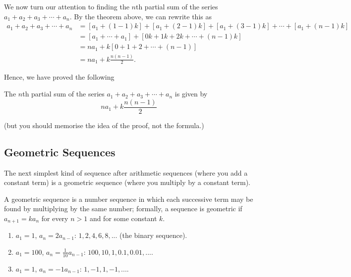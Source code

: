 We now turn our attention to finding the $ n$th partial sum of the series $ a_1 + a_2 + a_3 + \cdots + a_n $. By the
theorem above, we can rewrite this as
\begin{align*}
  a_1 + a_2 + a_3 + \cdots + a_n &= [a_1 + (1 - 1)k] + [a_1 + (2 - 1)k] + [a_1 + (3 - 1)k] + \cdots + [a_1 + (n - 1)k]\\
                                 &= [a_1 + \cdots + a_1] + [0k + 1k + 2k + \cdots + (n-1)k]\\
                                 &= na_1 + k[0 + 1 + 2 + \cdots + (n - 1)]\\
                                 &= na_1 + k \frac{n(n - 1)}{2}.
\end{align*}

Hence, we have proved the following
\begin{thm}
  The $ n$th partial sum of the series $ a_1 + a_2 + a_3 + \cdots + a_n $ is given by
  \begin{displaymath}
    na_1 + k \frac{n(n - 1)}{2}
  \end{displaymath}
\end{thm}
(but you should memorise the idea of the proof, not the formula.)

\subsection*{Geometric Sequences}
The next simplest kind of sequence after arithmetic sequences (where you add a constant term) is a geometric
sequence (where you multiply by a constant term).
\begin{defn}
  A geometric sequence is a number sequence in which each successive term may be found by multiplying by the
  same number; formally, a sequence is geometric if $ a_{n + 1} = ka_n $ for every $ n > 1 $ and for
  some constant $ k $.
\end{defn}

\begin{ex}\leavevmode
  \begin{enumerate}
    \item $ a_1 = 1 $, $ a_n = 2a_{n - 1} $: $ 1, 2, 4, 6, 8, ... $ (the binary sequence).
    \item $ a_1 = 100 $, $ a_n = \frac{1}{10} a_{n - 1} $: $ 100, 10, 1, 0.1, 0.01, ... $.
    \item $ a_1 = 1 $, $ a_n = -1 a_{n - 1} $: $ 1, -1, 1, -1, ... $.
  \end{enumerate}
\end{ex}



